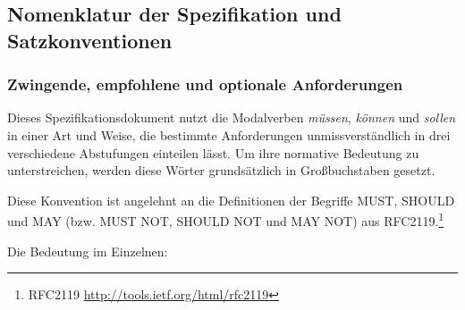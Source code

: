 \documentclass[,a4paper]{article}
\begin{document}
\subsection{Nomenklatur der Spezifikation und
Satzkonventionen}\label{nomenklatur-der-spezifikation-und-satzkonventionen}

\subsubsection{Zwingende, empfohlene und optionale
Anforderungen}\label{mussux5fsollux5fdarf}

Dieses Spezifikationsdokument nutzt die Modalverben \emph{müssen},
\emph{können} und \emph{sollen} in einer Art und Weise, die bestimmte
Anforderungen unmissverständlich in drei verschiedene Abstufungen
einteilen lässt. Um ihre normative Bedeutung zu unterstreichen, werden
diese Wörter grundsätzlich in Großbuchstaben gesetzt.

Diese Konvention ist angelehnt an die Definitionen der Begriffe MUST,
SHOULD und MAY (bzw. MUST NOT, SHOULD NOT und MAY NOT) aus
RFC2119.\footnote{RFC2119 \url{http://tools.ietf.org/html/rfc2119}}

Die Bedeutung im Einzelnen:
\end{document}
